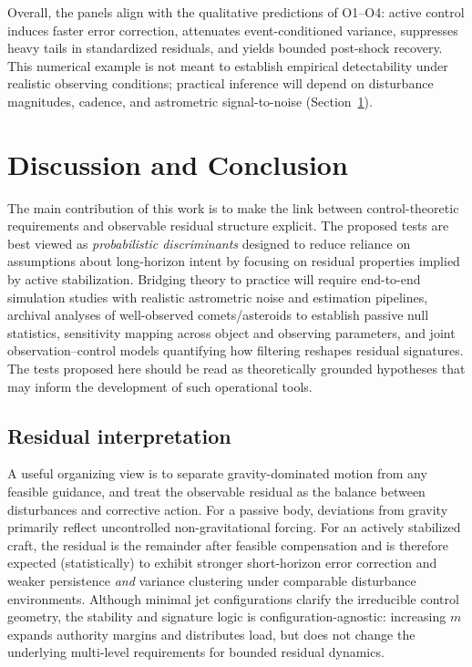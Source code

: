 \documentclass{article}
\begin{document}
Overall, the panels align with the qualitative predictions of O1--O4: active control induces faster error correction, attenuates event-conditioned variance, suppresses heavy tails in standardized residuals, and yields bounded post-shock recovery. This numerical example is not meant to establish empirical detectability under realistic observing conditions; practical inference will depend on disturbance magnitudes, cadence, and astrometric signal-to-noise (Section~\ref{sec:conclusion}).


\section{Discussion and Conclusion}
\label{sec:conclusion}

The main contribution of this work is to make the link between control-theoretic requirements and observable residual structure explicit. The proposed tests are best viewed as \emph{probabilistic discriminants} designed to reduce reliance on assumptions about long-horizon intent by focusing on residual properties implied by active stabilization. Bridging theory to practice will require end-to-end simulation studies with realistic astrometric noise and estimation pipelines, archival analyses of well-observed comets/asteroids to establish passive null statistics, sensitivity mapping across object and observing parameters, and joint observation--control models quantifying how filtering reshapes residual signatures. The tests proposed here should be read as theoretically grounded hypotheses that may inform the development of such operational tools.


\subsection{Residual interpretation}

A useful organizing view is to separate gravity-dominated motion from any feasible guidance, and treat the observable residual as the balance between disturbances and corrective action. For a passive body, deviations from gravity primarily reflect uncontrolled non-gravitational forcing. For an actively stabilized craft, the residual is the remainder after feasible compensation and is therefore expected (statistically) to exhibit stronger short-horizon error correction and weaker persistence \emph{and} variance clustering under comparable disturbance environments. Although minimal jet configurations clarify the irreducible control geometry, the stability and signature logic is configuration-agnostic: increasing $m$ expands authority margins and distributes load, but does not change the underlying multi-level requirements for bounded residual dynamics.
\end{document}
